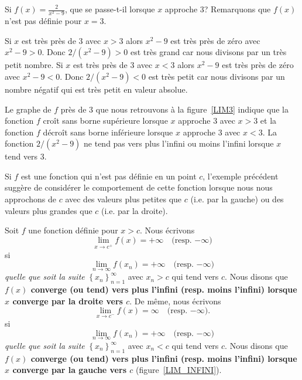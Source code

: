 {

\begin{egg}
Si $\displaystyle f(x) = \frac{2}{x^2-9}$, que se passe-t-il lorsque
$x$ approche $3$?  Remarquons que $f(x)$ n'est pas définie pour
$x=3$.

Si $x$ est très près de $3$ avec $x>3$ alors $x^2-9$ est très près de
zéro avec $x^2-9>0$.  Donc $2/(x^2-9)>0$ est très grand car nous divisons
par un très petit nombre.  Si $x$ est très près de $3$ avec $x<3$
alors $x^2-9$ est très près de zéro avec $x^2-9<0$.  Donc
$2/(x^2-9)<0$ est très petit car nous divisons par un nombre négatif qui
est très petit en valeur absolue.

Le graphe de $f$ près de $3$ que nous retrouvons à la figure~\ref{LIM3}
indique que la fonction $f$ croît sans borne supérieure lorsque $x$
approche $3$ avec $x>3$ et la fonction $f$ décroît sans borne
inférieure lorsque $x$ approche $3$ avec $x<3$.  La fonction
$2/(x^2-9)$ ne tend pas vers plus l'infini ou moins l'infini lorsque
$x$ tend vers $3$.
\end{egg}


Si $f$ est une fonction qui n'est pas définie en un point $c$,
l'exemple précédent suggère de considérer le comportement de cette
fonction lorsque nous nous approchons de $c$ avec des valeurs plus petites
que $c$ (i.e. par la gauche) ou des valeurs plus grandes que $c$ (i.e.
par la droite).

\begin{focus}{\dfn} 
Soit $f$ une fonction définie pour $x>c$.  Nous écrivons
\[
\lim_{x\rightarrow c^+} f(x) = +\infty  \quad \text{(resp. $-\infty$)}
\]
si
\[
\lim_{n\rightarrow \infty} f(x_n) = +\infty  \quad \text{(resp. $-\infty$)} 
\]
{\em quelle que soit la suite}
$\displaystyle \left\{x_n\right\}_{n=1}^\infty$ avec {\em $x_n >c$}
qui tend vers $c$.
Nous disons que {\bfseries $f(x)$ converge (ou tend) vers plus l'infini
(resp. moins l'infini) lorsque $x$ converge par la droite vers $c$}.
De même, nous écrivons
\[
\lim_{x\rightarrow c^-} f(x) = \infty \quad \text{(resp. $-\infty$)}.
\]
si
\[
\lim_{n\rightarrow \infty} f(x_n) = +\infty  \quad \text{(resp. $-\infty$)} 
\]
{\em quelle que soit la suite}
$\displaystyle \left\{x_n\right\}_{n=1}^\infty$ avec {\em $x_n <c$}
qui tend vers $c$.
Nous disons que {\bfseries $f(x)$ converge (ou tend) vers plus l'infini
(resp. moins l'infini) lorsque $x$ converge par la gauche vers $c$}
(figure~\ref{LIM_INFINI}).
\end{focus}

}
